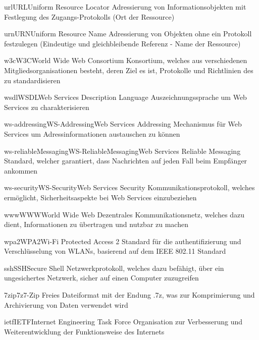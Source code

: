 \newdefineabbreviation
{url}{URL}{Uniform Resource Locator}
{Adressierung von Informationsobjekten mit Festlegung
des Zugangs-Protokolls (Ort der Ressource)}

\newdefineabbreviation
{urn}{URN}{Uniform Resource Name}
{Adressierung von Objekten ohne ein Protokoll festzulegen
	(Eindeutige und gleichbleibende Referenz - Name der Ressource)}

\newdefineabbreviation
{w3c}{W3C}{World Wide Web Consortium}
{Konsortium, welches aus verschiedenen Mitgliedsorganisationen besteht,
	deren Ziel es ist, Protokolle und Richtlinien des  zu standardisieren}

\newdefineabbreviation
{wsdl}{WSDL}{Web Services Description Language}
{Auszeichnungssprache um Web Services zu charakterisieren}

\newdefineabbreviation
{ws-addressing}{WS-Addressing}{Web Services Addressing}
{Mechanismus für Web Services um Adressinformationen austauschen zu können}

\newdefineabbreviation
{ws-reliableMessaging}{WS-ReliableMessaging}{Web Services Reliable Messaging}
{Standard, welcher garantiert, dass Nachrichten auf jeden Fall beim Empfänger ankommen}

\newdefineabbreviation
{ws-security}{WS-Security}{Web Services Security}
{Kommunikationsprotokoll, welches ermöglicht,
	Sicherheitsaspekte bei Web Services einzubeziehen}

\newdefineabbreviation
{www}{WWW}{World Wide Web}
{Dezentrales Kommunikationsnetz, welches dazu dient,
	Informationen zu übertragen und nutzbar zu machen}

\newdefineabbreviation
{wpa2}{WPA2}{Wi-Fi Protected Access 2}
{Standard für die \gls{authentifizierung} und Verschlüsselung von WLANs,
	basierend auf dem IEEE 802.11 Standard}

\newdefineabbreviation
{ssh}{SSH}{Secure Shell}
{Netzwerkprotokoll, welches dazu befähigt, über ein ungesichertes Netzwerk,
	sicher auf einen Computer zuzugreifen}

\newdefineabbreviation
{7zip}{7z}{7-Zip}
{Freies Dateiformat mit der Endung .7z,
	was zur Komprimierung und Archivierung von Daten verwendet wird}

\newdefineabbreviation
{ietf}{IETF}{Internet Engineering Task Force}
{Organisation zur Verbesserung und Weiterentwicklung der Funktionsweise des Internets}




